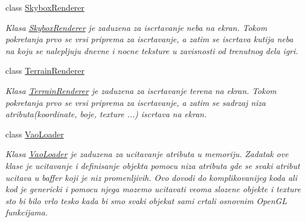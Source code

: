 \begin{DoxyCompactItemize}
class \hyperlink{classcore_1_1SkyboxRenderer}{Skybox\+Renderer}
\begin{DoxyCompactList}\small\item\em Klasa \hyperlink{classcore_1_1SkyboxRenderer}{Skybox\+Renderer} je zaduzena za iscrtavanje neba na ekran. Tokom pokretanja prvo se vrsi priprema za iscrtavanje, a zatim se iscrtava kutija neba na koju se nalepljuju dnevne i nocne teksture u zavisnosti od trenutnog dela igri. \end{DoxyCompactList}\item 
class \hyperlink{classcore_1_1TerrainRenderer}{Terrain\+Renderer}
\begin{DoxyCompactList}\small\item\em Klasa \hyperlink{classcore_1_1TerrainRenderer}{Terrain\+Renderer} je zaduzena za iscrtavanje terena na ekran. Tokom pokretanja prvo se vrsi priprema za iscrtavanje, a zatim se sadrzaj niza atributa(koordinate, boje, texture ...) iscrtava na ekran. \end{DoxyCompactList}\item 
class \hyperlink{classcore_1_1VaoLoader}{Vao\+Loader}
\begin{DoxyCompactList}\small\item\em Klasa \hyperlink{classcore_1_1VaoLoader}{Vao\+Loader} je zaduzena za ucitavanje atributa u memoriju. Zadatak ove klase je ucitavanje i definisanje objekta pomocu niza atributa gde se svaki atribut ucitava u baffer koji je niz promenljivih. Ovo dovodi do komplikovanijeg koda ali kod je genericki i pomocu njega mozemo ucitavati veoma slozene objekte i texture sto bi bilo vrlo tesko kada bi smo svaki objekat sami crtali osnovnim Open\+GL funkcijama. \end{DoxyCompactList}\end{DoxyCompactItemize}
